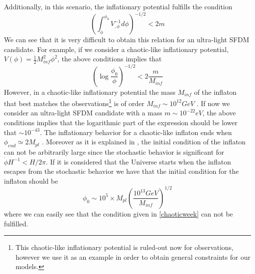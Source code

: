 \documentclass[amssymb,twocolumn,prd,nofootinbib,showpacs]{revtex4-1}
\begin{document}
Additionally, in this scenario, the inflationary potential fulfills the condition 
\begin{equation}
\left(\int^{\phi_0}_\phi V_{,\phi}^{-1}d\phi\right)^{-1/2}<2m
\end{equation}
We can see that it is very difficult to obtain this relation for an ultra-light SFDM candidate. For example, if we consider a chaotic-like inflationary potential, $V(\phi)=\frac{1}{2}M_{inf}^2\phi^2$, the above conditions implies that
\begin{equation}\label{chaoticweek}
\left(\log\frac{\phi_0}{\phi}\right)^{-1/2}<2\frac{m}{M_{inf}}
\end{equation}
However, in a chaotic-like inflationary potential the mass $M_{inf}$ of the inflaton that best matches the observations\footnote{This chaotic-like inflationary potential is ruled-out now for observations, however we use it as an example in order to obtain general constraints for our models.} is of order $M_{inf}\sim 10^{12} GeV$ \cite{Liddle}. If now we consider an ultra-light SFDM candidate with a mass $m\sim 10^{-22}eV$, the above conditions implies that the logarithmic part of the expression should be lower that $\sim 10^{-43}$. The inflationary behavior for a chaotic-like inflaton ends when $\phi_{end}\simeq 2M_{pl}$ \cite{curvatonatractor,Liddle}. Moreover as it is explained in \cite{curvatonatractor}, the initial condition of the inflaton can not be arbitrarily large since the stochastic behavior is significant for $\dot\phi H^{-1}<H/2\pi$. If it is considered that the Universe starts when the inflaton escapes from the stochastic behavior we have that the initial condition for the inflaton should be
\begin{equation}\label{phi_0}
\phi_0\sim 10^5\times M_{pl}\left(\frac{10^{13}GeV}{M_{inf}}\right)^{1/2}
\end{equation}
where we can easily see that the condition given in \eqref{chaoticweek} can not be fulfilled.
\end{document}
